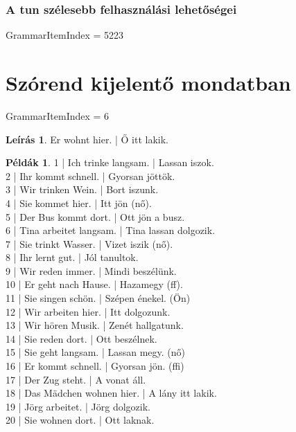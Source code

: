 \documentclass{article}
\theoremstyle{definition}
\newtheorem*{exmp}{Példák}
\newtheorem*{desc}{Leírás}
\begin{document}
\subsubsection{A tun szélesebb felhasználási lehetőségei}

GrammarItemIndex = 5223

\section{Szórend kijelentő mondatban}

GrammarItemIndex = 6

\begin{desc}
Er wohnt hier. | Ő itt lakik.
\end{desc}

\begin{exmp}
1 | Ich trinke langsam. | Lassan iszok.\\
2 | Ihr kommt schnell. | Gyorsan jöttök.\\
3 | Wir trinken Wein. | Bort iszunk.\\
4 | Sie kommet hier. | Itt jön (nő).\\
5 | Der Bus kommt dort. | Ott jön a busz.\\
6 | Tina arbeitet langsam. | Tina lassan dolgozik.\\
7 | Sie trinkt Wasser. | Vizet iszik (nő).\\
8 | Ihr lernt gut. | Jól tanultok.\\
9 | Wir reden immer. | Mindi beszélünk.\\
10 | Er geht nach Hause. | Hazamegy (ff).\\
11 | Sie singen schön. | Szépen énekel. (Ön)\\
12 | Wir arbeiten hier. | Itt dolgozunk.\\
13 | Wir hören Musik. | Zenét hallgatunk.\\
14 | Sie reden dort. | Ott beszélnek.\\
15 | Sie geht langsam. | Lassan megy. (nő)\\
16 | Er kommt schnell. | Gyorsan jön. (ffi)\\
17 | Der Zug steht. | A vonat áll.\\
18 | Das Mädchen wohnen hier. | A lány itt lakik.\\
19 | Jörg arbeitet. | Jörg dolgozik.\\
20 | Sie wohnen dort. | Ott laknak.\\
\end{exmp}
\end{document}
